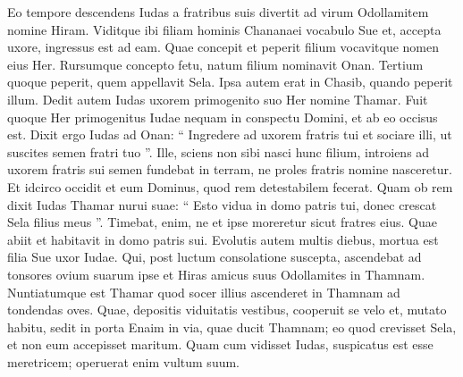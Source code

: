 \begin{biblechapter}
\begin{biblechapter}
\begin{biblechapter}
\begin{biblechapter}
\begin{biblechapter}
\begin{biblechapter}
\begin{biblechapter}
\begin{biblechapter}
\begin{biblechapter}
\begin{biblechapter}
\begin{biblechapter}
\begin{biblechapter}
\begin{biblechapter}
\begin{biblechapter}
\begin{biblechapter}
\begin{biblechapter}
\begin{biblechapter}
\begin{biblechapter}
\begin{biblechapter}
\begin{biblechapter}
\begin{biblechapter}
\begin{biblechapter}
\begin{biblechapter}
\begin{biblechapter}
\begin{biblechapter}
\begin{biblechapter}
\begin{biblechapter}
\begin{biblechapter}
\begin{biblechapter}
\begin{biblechapter}
\begin{biblechapter}
\begin{biblechapter}
\begin{biblechapter}
\begin{biblechapter}
\begin{biblechapter}
\begin{biblechapter}
\begin{biblechapter}
\begin{biblechapter}
\verse Eo tempore descendens Iudas a fratribus suis divertit ad virum Odollamitem nomine Hiram. 
\verse Viditque ibi filiam hominis Chananaei vocabulo Sue et, accepta uxore, ingressus est ad eam. 
\verse Quae concepit et peperit filium vocavitque nomen eius Her. 
\verse Rursumque concepto fetu, natum filium nominavit Onan. 
\verse Tertium quoque peperit, quem appellavit Sela. Ipsa autem erat in Chasib, quando peperit illum.
 \verse Dedit autem Iudas uxorem primogenito suo Her nomine Thamar. 
\verse Fuit quoque Her primogenitus Iudae nequam in conspectu Domini, et ab eo occisus est. 
\verse Dixit ergo Iudas ad Onan: “ Ingredere ad uxorem fratris tui et sociare illi, ut suscites semen fratri tuo ”. 
\verse Ille, sciens non sibi nasci hunc filium, introiens ad uxorem fratris sui semen fundebat in terram, ne proles fratris nomine nasceretur. 
\verse Et idcirco occidit et eum Dominus, quod rem detestabilem fecerat. 
\verse Quam ob rem dixit Iudas Thamar nurui suae: “ Esto vidua in domo patris tui, donec crescat Sela filius meus ”. Timebat, enim, ne et ipse moreretur sicut fratres eius. Quae abiit et habitavit in domo patris sui.
 \verse Evolutis autem multis diebus, mortua est filia Sue uxor Iudae. Qui, post luctum consolatione suscepta, ascendebat ad tonsores ovium suarum ipse et Hiras amicus suus Odollamites in Thamnam. 
\verse Nuntiatumque est Thamar quod socer illius ascenderet in Thamnam ad tondendas oves. 
\verse Quae, depositis viduitatis vestibus, cooperuit se velo et, mutato habitu, sedit in porta Enaim in via, quae ducit Thamnam; eo quod crevisset Sela, et non eum accepisset maritum. 
\verse Quam cum vidisset Iudas, suspicatus est esse meretricem; operuerat enim vultum suum. 

\end{biblechapter}
\end{biblechapter}
\end{biblechapter}
\end{biblechapter}
\end{biblechapter}
\end{biblechapter}
\end{biblechapter}
\end{biblechapter}
\end{biblechapter}
\end{biblechapter}
\end{biblechapter}
\end{biblechapter}
\end{biblechapter}
\end{biblechapter}
\end{biblechapter}
\end{biblechapter}
\end{biblechapter}
\end{biblechapter}
\end{biblechapter}
\end{biblechapter}
\end{biblechapter}
\end{biblechapter}
\end{biblechapter}
\end{biblechapter}
\end{biblechapter}
\end{biblechapter}
\end{biblechapter}
\end{biblechapter}
\end{biblechapter}
\end{biblechapter}
\end{biblechapter}
\end{biblechapter}
\end{biblechapter}
\end{biblechapter}
\end{biblechapter}
\end{biblechapter}
\end{biblechapter}
\end{biblechapter}
